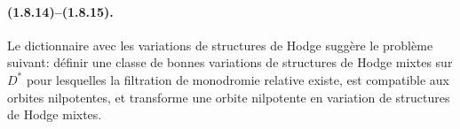 \documentclass[11pt]{article}
\theoremstyle{remark}
\begin{document}
\paragraph{(1.8.14)--(1.8.15).} Le dictionnaire avec les variations de structures de Hodge suggère le problème suivant: définir une classe de bonnes variations de structures de Hodge mixtes sur $D^*$ pour lesquelles la filtration de monodromie relative existe, est compatible aux orbites nilpotentes, et transforme une orbite nilpotente en variation de structures de Hodge mixtes.
\end{document}
